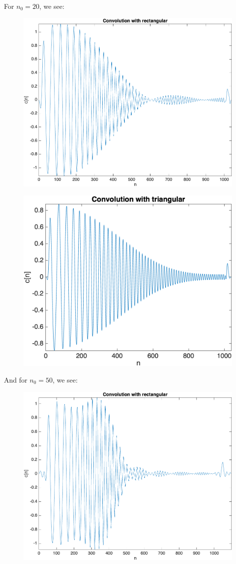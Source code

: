 \documentclass[12pt]{article}
\begin{document}
\begin{enumerate}[label=\textbf{\alph*)}, leftmargin=2.6em]
\begin{figure} [H]
\end{figure}
For $n_0=20$, we see:
\begin{figure} [H]
    \centering
    \includegraphics[width=0.75\linewidth]{22.png}
\end{figure}
\begin{figure} [H]
    \centering
    \includegraphics[width=0.75\linewidth]{23.png}
\end{figure}
And for $n_0=50$, we see:
\begin{figure} [H]
    \centering
    \includegraphics[width=0.75\linewidth]{25.png}

\end{figure}
\end{enumerate}
\end{document}
